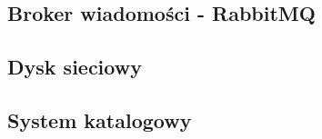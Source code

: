 \documentclass[../../deliverable-two.tex]{subfiles}
\begin{document}
\label{external-modules}

\subsection{Broker wiadomości - RabbitMQ}

\subsection{Dysk sieciowy}

\subsection{System katalogowy}
\end{document}
